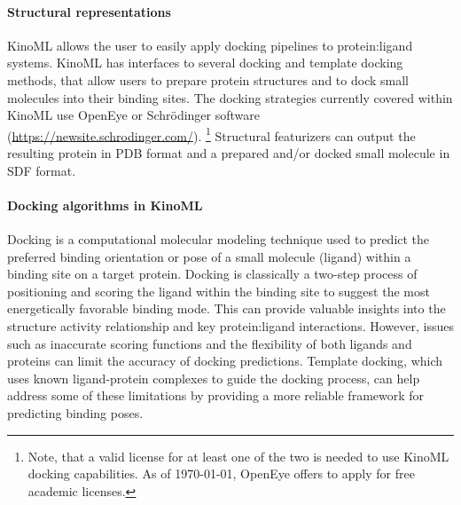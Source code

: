 \documentclass[9pt,lessons]{livecoms}
\begin{document}
\paragraph{\textbf{Structural representations}}
KinoML allows the user to easily apply docking pipelines to protein:ligand systems. KinoML has interfaces to several docking and template docking methods, that allow users to prepare protein structures and to dock small molecules into their binding sites. The docking strategies currently covered within KinoML use OpenEye \cite{oedocking} or Schrödinger software (\url{https://newsite.schrodinger.com/}). \footnote{Note, that a valid license for at least one of the two is needed to use KinoML docking capabilities. As of \today, OpenEye offers to apply for free academic licenses.} Structural featurizers can output the resulting protein in PDB format and a prepared and/or docked small molecule in SDF format.

\paragraph{Docking algorithms in KinoML} Docking is a computational molecular modeling technique used to predict the preferred binding orientation or pose of a small molecule (ligand) within a binding site on a target protein. \cite{morris2008molecular} Docking is classically a two-step process of positioning and scoring the ligand within the binding site to suggest the most energetically favorable binding mode. This can provide valuable insights into the structure activity relationship and key protein:ligand interactions. However, issues such as inaccurate scoring functions and the flexibility of both ligands and proteins can limit the accuracy of docking predictions. Template docking, which uses known ligand-protein complexes to guide the docking process, can help address some of these limitations by providing a more reliable framework for predicting binding poses.
\end{document}
